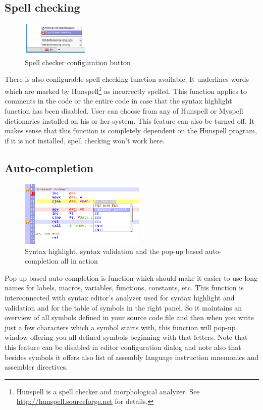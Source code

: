 \documentclass[a4paper,twoside,12pt]{book}
\begin{document}
		\subsection{Spell checking}
			\begin{figure}
				\centering{}
				\includegraphics[width=90pt]{img/037.png}
				\caption{Spell checker configuration button}
			\end{figure}
			There is also configurable spell checking function available. It underlines words which are marked by Hunspell\footnote{Hunspell is a spell checker and morphological analyzer. See \url{http://hunspell.sourceforge.net} for details.} as incorrectly spelled. This function applies to comments in the code or the entire code in case that the syntax highlight function has been disabled. User can choose from any of Hunspell or Myspell dictionaries installed on his or her system. This feature can also be turned off. It makes sense that this function is completely dependent on the Hunspell program, if it is not installed, spell checking won't work here.
		\subsection{Auto-completion}
			\begin{figure}
				\centering{}
				\includegraphics[width=170pt]{img/038.png}
				\caption{Syntax highlight, syntax validation and the pop-up based auto-completion all in action}
			\end{figure}
			Pop-up based auto-completion is function which should make it easier to use long names for labels, macros, variables, functions, constants, etc. This function is interconnected with syntax editor's analyzer used for syntax highlight and validation and for the table of symbols in the right panel. So it maintains an overview of all symbols defined in your source code file and then when you write just a few characters which a symbol starts with, this function will pop-up window offering you all defined symbols beginning with that letters. Note that this feature can be disabled in editor configuration dialog and note also that besides symbols it offers also list of assembly language instruction mnemonics and assembler directives.
\end{document}
